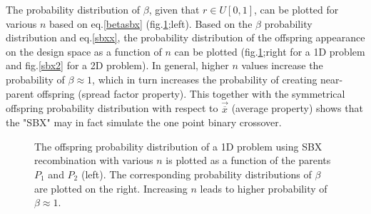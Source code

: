 \begin{itemize}
The probability distribution of $\beta$, given that $r\in U[0,1]$, can be plotted for various $n$ based on eq.\ref{betasbx} (fig.\ref{sbx};left). Based on the $\beta$ probability distribution and eq.\ref{sbxx}, the probability distribution of the offspring appearance on the design space as a function of $n$ can be plotted (fig.\ref{sbx};right for a 1D problem and fig.\ref{sbx2} for a 2D problem). In general, higher $n$ values increase the probability of $\beta \approx 1$, which in turn increases the probability of creating near-parent offspring (spread factor property). This together with the symmetrical offspring probability distribution with respect to $\vec{\overline{x}}$ (average property) shows that the "SBX" may in fact simulate the one point binary crossover.    

\begin{figure}[h!]
\begin{minipage}[b]{0.5\linewidth}
 \centering
\end{minipage}
\begin{minipage}[b]{0.5\linewidth}
 \centering
\end{minipage}
\caption{The offspring probability distribution of a 1D problem using SBX recombination with various $n$ is plotted as a function of the parents $P_1$ and $P_2$ (left). The corresponding probability distributions of $\beta$ are plotted on the right. Increasing $n$ leads to higher probability of $\beta \approx 1$.  }
\label{sbx}
\end{figure}


\end{itemize}
